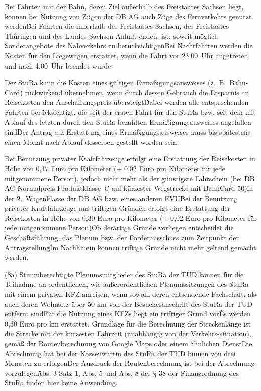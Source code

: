 \Abs \Satz Bei Fahrten mit der Bahn, deren Ziel außerhalb des Freistaates Sachsen liegt, können bei Nutzung von Zügen der DB AG auch Züge des Fernverkehrs genutzt werden\. Bei Fahrten die innerhalb des Freistaates Sachsen, des Freistaates Thüringen und des Landes Sachsen-Anhalt enden, ist, soweit möglich Sonderangebote des Nahverkehrs zu berücksichtigen\. Bei Nachtfahrten werden die Kosten für den Liegewagen erstattet, wenn die Fahrt vor 23.00~Uhr angetreten und nach 4.00~Uhr beendet wurde.

\Abs \Satz Der StuRa kann die Kosten eines gültigen Ermäßigungsausweises (z.~B.~Bahn-Card) rückwirkend übernehmen, wenn durch dessen Gebrauch die Ersparnis an Reisekosten den Anschaffungspreis übersteigt\. Dabei werden alle entsprechenden Fahrten berücksichtigt, die seit der ersten Fahrt für den StuRa bzw. seit dem mit Ablauf des letzten durch den StuRa bezahlten Ermäßigungsausweises angefallen sind\. Der Antrag auf Erstattung eines Ermäßigungsausweises muss bis spätestens einen Monat nach Ablauf desselben gestellt worden sein.

\Abs \Satz Bei  Benutzung  privater   Kraftfahrzeuge  erfolgt  eine  Erstattung  der Reisekosten in Höhe von 0,17 Euro pro Kilometer (+ 0,02 Euro pro Kilometer für jede mitgenommene Person), jedoch nicht  mehr  als  der  günstigste Fahrschein (bei DB AG Normalpreis Produktklasse~C auf kürzester Wegstrecke mit BahnCard 50)in der 2.~Wagenklasse der DB AG bzw. eines anderen EVU\. Bei der Benutzung privater Kraftfahrzeuge aus triftigen Gründen erfolgt eine Erstattung der Reisekosten in Höhe von 0,30 Euro pro Kilometer (+ 0,02 Euro pro Kilometer für jede mitgenommene Person)\. Ob derartige Gründe vorliegen entscheidet die Geschäftsführung, das Plenum bzw. der Förderausschuss zum Zeitpunkt der Antragstellung\. Im Nachhinein können triftige Gründe nicht mehr geltend gemacht werden. \
 
(8a) \Satz Stimmberechtigte Plenumsmitglieder des StuRa der TUD können für die Teilnahme an ordentlichen, wie außerordentlichen Plenumssitzungen des StuRa mit einem privaten KFZ anreisen, wenn sowohl deren entsendende Fachschaft, als auch deren Wohnsitz über 50 km von der Besucheranschrift des StuRa der TUD entfernt sind\. Für die Nutzung eines KFZs liegt ein triftiger Grund vor\. Es werden 0,30 Euro pro km erstattet. Grundlage für die Berechnung der Streckenlänge ist die Strecke mit der kürzesten Fahrzeit (unabhängig von der Verkehrs-situation), gemäß der Routenberechnung von Google Maps oder einem ähnlichen Dienst\. Die Abrechnung hat bei der Kassenwärtin des StuRa der TUD binnen von drei Monaten zu erfolgen\. Der Ausdruck der Routenberechnung ist bei der Abrechnung vorzulegen\. Abs. 3 Satz 1, Abs. 5 und Abs. 8 des § 38 der Finanzordnung des StuRa finden hier keine Anwendung.

